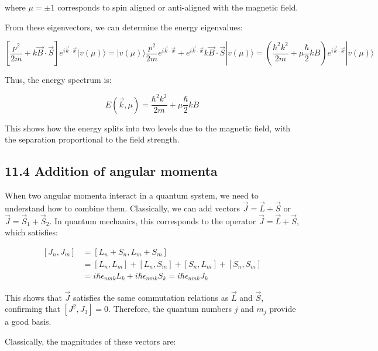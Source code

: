 \documentclass[italian]{HKNdocument}
\begin{document}
where $\mu = \pm 1$ corresponds to spin aligned or anti-aligned with the magnetic field.


From these eigenvectors, we can determine the energy eigenvalues:

\begin{equation*}
\left[\frac{p^{2}}{2 m}+k \vec{B} \cdot \vec{S}\right] e^{i \vec{k} \cdot \vec{x}}|v(\mu)\rangle=|v(\mu)\rangle \frac{p^{2}}{2 m} e^{i \vec{k} \cdot \vec{x}}+e^{i \vec{k} \cdot \vec{x}} k \vec{B} \cdot \vec{S}|v(\mu)\rangle=\left(\frac{\hbar^{2} k^{2}}{2 m}+\mu \frac{\hbar}{2} k B\right) e^{i \vec{k} \cdot \vec{x}}|v(\mu)\rangle \tag{11.34}
\end{equation*}

Thus, the energy spectrum is:

\begin{equation*}
E(\vec{k}, \mu)=\frac{\hbar^{2} k^{2}}{2 m}+\mu \frac{\hbar}{2} k B \tag{11.35}
\end{equation*}

This shows how the energy splits into two levels due to the magnetic field, with the separation proportional to the field strength.

\subsection*{11.4 Addition of angular momenta}
When two angular momenta interact in a quantum system, we need to understand how to combine them. Classically, we can add vectors $\vec{J}=\vec{L}+\vec{S}$ or $\vec{J}=\vec{S}_1+\vec{S}_2$. In quantum mechanics, this corresponds to the operator $\vec{J}=\vec{L}+\vec{S}$, which satisfies:

\begin{align*}
\left[J_{n}, J_{m}\right] &= \left[L_{n}+S_{n}, L_{m}+S_{m}\right]\\
&= \left[L_{n}, L_{m}\right]+\left[L_{n}, S_{m}\right]+\left[S_{n}, L_{m}\right]+\left[S_{n}, S_{m}\right]\\
&= i \hbar \epsilon_{n m k} L_{k}+i \hbar \epsilon_{n m k} S_{k}=i \hbar \epsilon_{n m k} J_{k} \tag{11.36}
\end{align*}

This shows that $\vec{J}$ satisfies the same commutation relations as $\vec{L}$ and $\vec{S}$, confirming that $\left[J^{2}, J_{3}\right]=0$. Therefore, the quantum numbers $j$ and $m_j$ provide a good basis.

Classically, the magnitudes of these vectors are:
\end{document}
